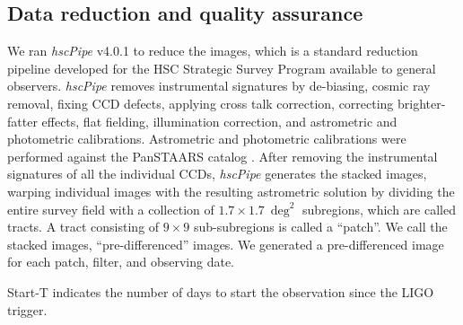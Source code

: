 \documentclass[]{pasj01}
\begin{document}
\subsection{Data reduction and quality assurance}
We ran \emph{hscPipe} v4.0.1 to reduce the images,
which is a standard reduction pipeline \citep{2017arXiv170506766B} developed for the HSC Strategic Survey Program \citep[HSC SSP;][]{2017arXiv170405858A}
available to general observers.
\emph{hscPipe} removes instrumental signatures by de-biasing,
cosmic ray removal, fixing CCD defects, applying cross talk correction,
correcting brighter-fatter effects,  flat fielding, illumination correction,
and astrometric and photometric calibrations.
Astrometric and photometric calibrations were performed against the PanSTAARS catalog \citep{2016arXiv161205560C}.
After removing the instrumental signatures of all the individual CCDs, \emph{hscPipe} generates the stacked images,
warping individual images with the resulting astrometric solution by
dividing the entire survey field with a collection of $1.7\times1.7~{\deg}^2$ subregions, which are called tracts.
A tract consisting of $9\times 9$ sub-subregions is called a ``patch''.
We call the stacked images, ``pre-differenced'' images.
We generated a pre-differenced image for  each patch, filter, and observing date.

\begin{table*}[htdp]
\label{tab:stacked}
\begin{tabnote}
\footnotemark[$*$] Start-T indicates the number of days to start the observation since the LIGO trigger.
\end{tabnote}
\end{table*}%
\end{document}
